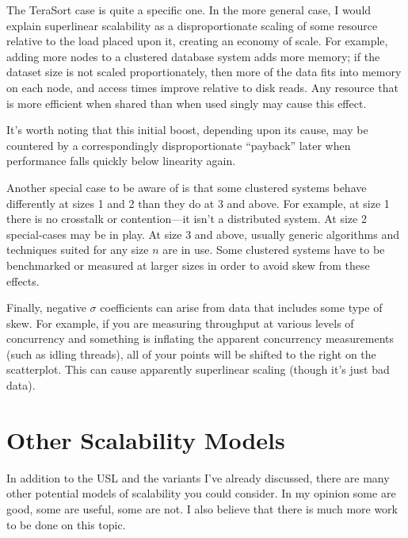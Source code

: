 \documentclass{vivid_layout}
\begin{document}
The TeraSort case is quite a specific one. In the more general case, I would
explain superlinear scalability as a disproportionate scaling of some resource
relative to the load placed upon it, creating an economy of scale. For example,
adding more nodes to a clustered database system adds more memory; if the
dataset size is not scaled proportionately, then more of the data fits into
memory on each node, and access times improve relative to disk reads. Any
resource that is more efficient when shared than when used singly may cause this
effect.

It's worth noting that this initial boost, depending upon its cause, may be
countered by a correspondingly disproportionate ``payback'' later when
performance falls quickly below linearity again.

Another special case to be aware of is that some clustered systems behave
differently at sizes 1 and 2 than they do at 3 and above. For example, at size 1
there is no crosstalk or contention---it isn't a distributed system. At size 2
special-cases may be in play. At size 3 and above, usually generic algorithms
and techniques suited for any size $n$ are in use. Some clustered systems have
to be benchmarked or measured at larger sizes in order to avoid skew from these
effects.

Finally, negative $\sigma$ coefficients can arise from data that includes some
type of skew. For example, if you are measuring throughput at various levels of
concurrency and something is inflating the apparent concurrency measurements
(such as idling threads), all of your points will be shifted to the right on the
scatterplot. This can cause apparently superlinear scaling (though it's just bad
data).

\section{Other Scalability Models}

In addition to the USL and the variants I've already discussed, there are many
other potential models of scalability you could consider. In my opinion some are
good, some are useful, some are not. I also believe that there is much more work
to be done on this topic.
\end{document}
